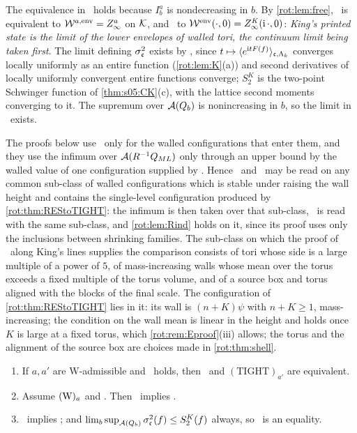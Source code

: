 The equivalence in \TIa\ holds because $I^a_b$ is nondecreasing in $b$. By \cref{rot:lem:free}, \TIa\ is equivalent to
$\mathcal W^{a,\mathrm{env}}=Z^a_\infty$ on $\mathcal K$, and \TIz\ to $\mathcal W^{\mathrm{env}}(\cdot,0)=Z^{K}_{\infty}(\mathrm i\,\cdot,0)$: \emph{King's printed state is the
limit of the lower envelopes of walled tori, the continuum limit being taken first}. The limit defining $\sigma^2_{\mathfrak c}$ exists by \Kz,
since $t\mapsto\langle e^{\mathrm itF(f)}\rangle_{\mathfrak c,\Lambda_k}$ converges locally uniformly as an entire function (\cref{rot:lem:K}(a)) and
second derivatives of locally uniformly convergent entire functions converge; $S^K_2$ is the two-point Schwinger function of
\cref{thm:s05:CK}(c), with the lattice second moments converging to it. The supremum over $\mathcal A(Q_{b})$ is nonincreasing in $b$, so the
limit in \TItwo\ exists.

\begin{remark}\label{rot:rem:class}
The proofs below use \Kz\ only for the walled configurations that enter them, and they use the infimum over $\mathcal A(R^{-1}Q_{ML})$ only
through an upper bound by the walled value of one configuration supplied by \TIz. Hence \Kz\ and \TIz\ may be read on any common
sub-class of walled configurations which is stable under raising the wall height and contains the single-level configuration produced
by \cref{rot:thm:REStoTIGHT}: the infimum is then taken over that sub-class, \TIz\ is read with the same sub-class, and
\cref{rot:lem:Rind} holds on it, since its proof uses only the inclusions between shrinking families. The sub-class on which the proof of
\Kz\ along King's lines \cite{K2} supplies the comparison consists of tori whose side is a large multiple of a power of $5$, of
mass-increasing walls whose mean over the torus exceeds a fixed multiple of the torus volume, and of a source box and torus aligned with
the blocks of the final scale. The configuration of \cref{rot:thm:REStoTIGHT} lies in it: its wall is $(n+K)\psi$ with $n+K\ge1$,
mass-increasing; the condition on the wall mean is linear in the height and holds once $K$ is large at a fixed torus, which
\cref{rot:rem:Eproof}(iii) allows; the torus and the alignment of the source box are choices made in \cref{rot:thm:shell}.
\end{remark}

\begin{lemma}\label{rot:lem:rel}
\begin{enumerate}[label=\textup{(\alph*)},leftmargin=*]
\item If $a,a'$ are $\mathrm W$-admissible and \Ka\ holds, then \TIa\ and $\mathrm{(TIGHT)}_{a'}$ are equivalent.
\item Assume $(\mathrm W)_{a}$ and \EC. Then \TIa\ implies \TIz.
\item \TIz\ implies \TItwo; and $\lim_b\sup_{\mathcal A(Q_{b})}\sigma^2_{\mathfrak c}(f)\le S^K_2(f)$ always, so \TItwo\ is an
equality.
\end{enumerate}
\end{lemma}

